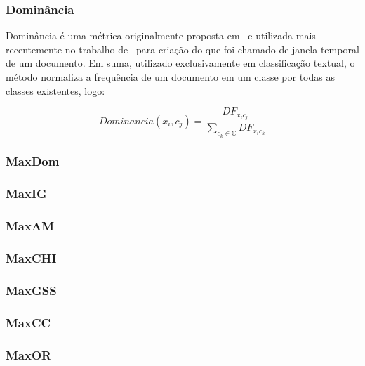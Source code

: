 \subsubsection{Dominância}
\label{subsubsection::dom}

Dominância é uma métrica originalmente proposta em~\cite{Zaiane02} e utilizada mais recentemente no trabalho de~\cite{Rocha08} para criação do que foi chamado de janela temporal de um documento. Em suma, utilizado exclusivamente em classificação textual, o método normaliza a frequência de um documento em um classe por todas as classes existentes, logo:

\begin{equation}\label{eqn::dom}
   Dominancia(x_i, c_j) = \frac{ DF_{x_ic_j} } { \sum\limits_{c_k \in \mathbb{C}} DF_{ x_ic_k } } 
\end{equation}




\subsubsection{MaxDom}
\label{subsubsection::maxdom}

\subsubsection{MaxIG}
\label{subsubsection::maxig}

\subsubsection{MaxAM}
\label{subsubsection::maxam}

\subsubsection{MaxCHI}
\label{subsubsection::maxchi}

\subsubsection{MaxGSS}
\label{subsubsection::maxgss}

\subsubsection{MaxCC}
\label{subsubsection::maxcc}

\subsubsection{MaxOR}
\label{subsubsection::maxor}

